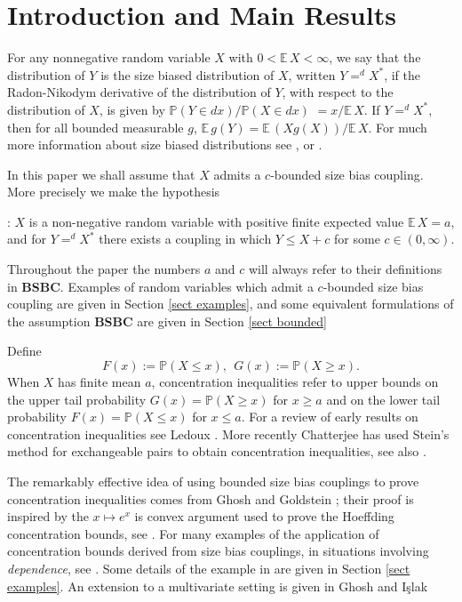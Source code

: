 \documentclass[smallextended,envcountsect]{svjour3}
\begin{document}
\section{Introduction and Main Results} \label{sect intro}

For any nonnegative random variable $X$
with $0 < {\mathbb{E \,}} X < \infty$, we say that the distribution of $Y$ is the size biased distribution of $X$, written $Y =^d X^*$, if
the Radon-Nikodym derivative  of the distribution of $Y$, with respect to the distribution of $X$, is given by  \mbox{${\mathbb{P}}(Y \in dx)/{\mathbb{P}}(X \in dx)$} $ = x/ {\mathbb{E \,}} X$. If $Y =^d X^*$, then for all
bounded measurable $g$,  ${\mathbb{E \,}} g(Y) = {\mathbb{E \,}}( X g(X)) / {\mathbb{E \,}} X$.  For much more information about size biased distributions see \cite{AGK}, or \cite[pp 78--80]{ABT}.

In this paper we shall assume that $X$ admits a $c$-bounded size bias coupling.  More precisely we make the hypothesis

\vspace{1ex}

:   $X$ is a non-negative random variable with positive finite expected value ${\mathbb{E \,}} X = a$, and for $Y =^d X^*$ there exists a coupling in which $  Y \le X+c$
for some $c \in (0,\infty)$.

\vspace{2ex}

Throughout the paper the numbers $a$ and $c$ will always refer to their definitions in {\bf BSBC}.  Examples of random variables which admit a $c$-bounded size bias coupling are given in Section \ref{sect examples}, and some equivalent formulations of the assumption {\bf BSBC} are given in Section \ref{sect bounded}

Define
$$
  F(x ) := {\mathbb{P}}( X \le x), \ \ G(x) := {\mathbb{P}}(X \ge x).
$$
When $X$ has finite mean $a$, concentration inequalities refer to upper bounds on the upper tail probability $G(x) = {\mathbb{P}}(X \ge x)$ for $x \ge a$ and on the lower tail probability $F(x) = {\mathbb{P}}(X \le x)$ for $x \le a$.  For a review of early results on concentration inequalities see Ledoux \cite{ledoux}.  More recently Chatterjee \cite{chatterjee} has used Stein's method for exchangeable pairs to obtain concentration inequalities, see also \cite{chatterjeedey}.

The remarkably effective idea of using bounded size bias couplings to prove concentration inequalities comes from
Ghosh and Goldstein \cite{GhoshGold};  their proof is inspired by the $x \mapsto e^x$ is convex argument used to prove the Hoeffding concentration bounds, see \cite{hoeffding}.  For many examples of the application of concentration bounds derived from size bias couplings, in situations involving \emph{dependence}, see \cite{GhoshGold2,GhoshGold,AGKillian,BGI}.  Some details of the example in \cite{AGKillian} are given in Section \ref{sect examples}.  An extension to a multivariate setting is given in Ghosh and I\c{s}lak \cite{GI}
\end{document}
